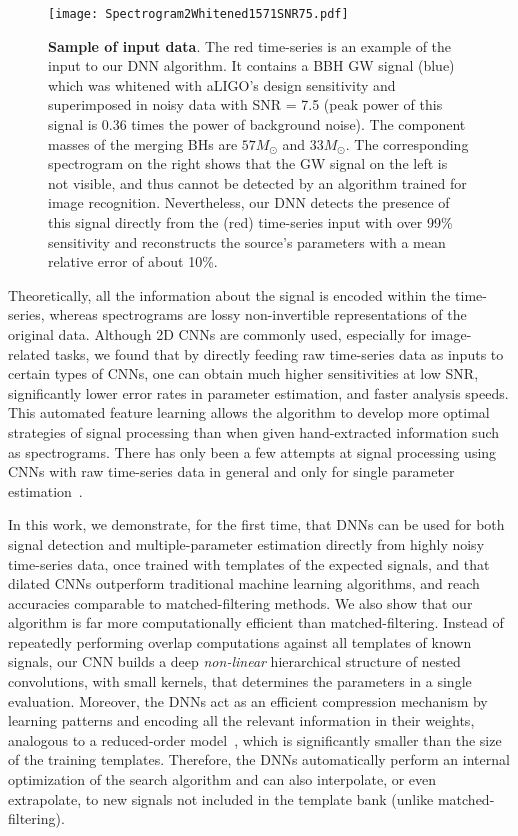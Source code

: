 \documentclass[aps,prd,%
amsmath,floats,floatfix, twocolumn, superscriptaddress,nofootinbib,showpacs]{revtex4-1}
\def\Msun{M_\odot}
\begin{document}
\begin{figure*}
		\texttt{[image: Spectrogram2Whitened1571SNR75.pdf]}
	\caption{\textbf{Sample of input data}. The red time-series is an example of the input to our DNN algorithm. It contains a BBH GW signal (blue) which was whitened with aLIGO's design sensitivity and superimposed in noisy data with SNR = 7.5 (peak power of this signal is 0.36 times the power of background noise). The component masses of the merging BHs are $57\Msun$ and $33\Msun$. The corresponding spectrogram on the right shows that the GW signal on the left is not visible, and thus cannot be detected by an algorithm trained for image recognition. Nevertheless, our DNN detects the presence of this signal directly from the (red) time-series input with over 99\% sensitivity and reconstructs the source's parameters with a mean relative error of about 10\%. }
	\label{fig:spectrogram}
\end{figure*}

\noindent Theoretically, all the information about the signal is encoded within the time-series, whereas spectrograms are lossy non-invertible representations of the original data. Although 2D CNNs are commonly used, especially for image-related tasks, we found that by directly feeding raw time-series data as inputs to certain types of CNNs, one can obtain much higher sensitivities at low SNR, significantly lower error rates in parameter estimation, and faster analysis speeds. This automated feature learning allows the algorithm to develop more optimal strategies of signal processing than when given hand-extracted information such as spectrograms. There has only been a few attempts at signal processing using CNNs with raw time-series data in general and only for single parameter estimation~\cite{ConvNet-Radio,ConvNet-TimeSeries}. 

In this work, we demonstrate, for the first time, that DNNs can be used for both signal detection and multiple-parameter estimation directly from highly noisy time-series data, once trained with templates of the expected signals, and that dilated CNNs outperform traditional machine learning algorithms, and reach accuracies comparable to matched-filtering methods. We also show that our algorithm is far more computationally efficient than matched-filtering. Instead of repeatedly performing overlap computations against all templates of known signals, our CNN builds a deep \textit{non-linear} hierarchical structure of nested convolutions, with small kernels, that determines the parameters in a single evaluation. Moreover, the DNNs act as an efficient compression mechanism by learning patterns and encoding all the relevant information in their weights, analogous to a reduced-order model~\cite{pu:2016PhRvD}, which is significantly smaller than the size of the training templates. Therefore, the DNNs automatically perform an internal optimization of the search algorithm and can also interpolate, or even extrapolate, to new signals not included in the template bank (unlike matched-filtering).
\end{document}
